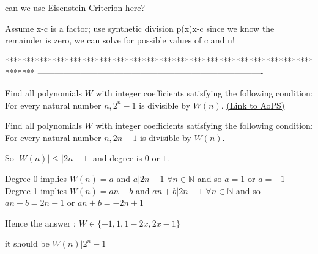 \begin{solution}
	can we use Eisenstein Criterion here?
\end{solution}



\begin{solution}
	Assume x-c is a factor; use synthetic division p(x)\/x-c since we know the remainder is zero, we can solve for possible values of c and n!
\end{solution}
*******************************************************************************
-------------------------------------------------------------------------------

\begin{problem}
	Find all polynomials $W$ with integer coefficients satisfying the following condition: For every natural number $n, 2^n - 1$ is divisible by $W(n).$
	\flushright \href{https://artofproblemsolving.com/community/c6h375193}{(Link to AoPS)}
\end{problem}



\begin{solution}
	\begin{tcolorbox}Find all polynomials $W$ with integer coefficients satisfying the following condition: For every natural number $n, 2n - 1$ is divisible by $W(n).$\end{tcolorbox}

So $|W(n)|\le |2n-1|$ and degree is $0$ or $1$.

Degree 0 implies $W(n)=a$ and $a|2n-1$ $\forall n\in\mathbb N$ and so $a=1$ or $a=-1$
Degree 1 implies $W(n)=an+b$ and $an+b|2n-1$ $\forall n\in\mathbb N$ and so $an+b=2n-1$ or $an+b=-2n+1$

Hence the answer : $\boxed{W\in\{-1,1,1-2x,2x-1\}}$
\end{solution}



\begin{solution}
	it should be $W(n)|2^n-1$
\end{solution}



